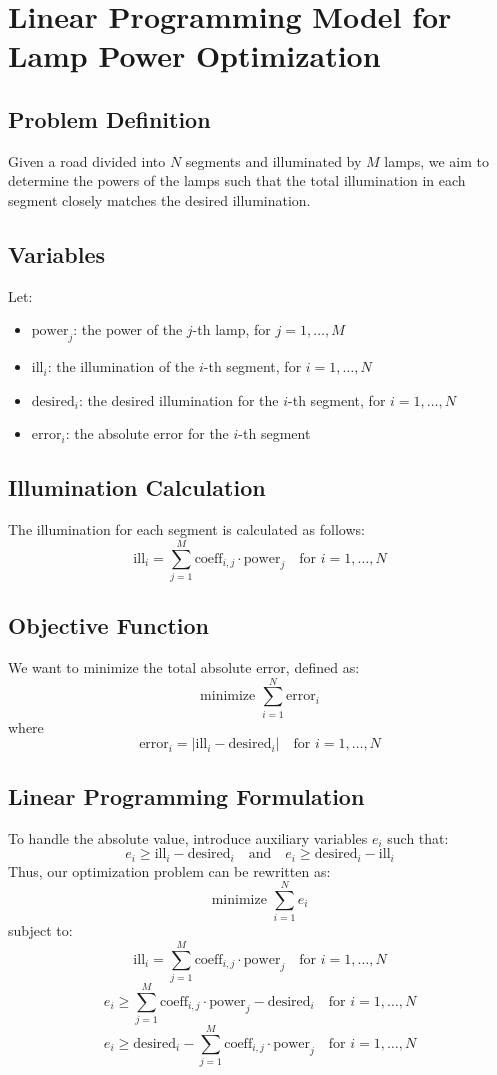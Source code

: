 \documentclass{article}
\begin{document}
\section*{Linear Programming Model for Lamp Power Optimization}

\subsection*{Problem Definition}
Given a road divided into \( N \) segments and illuminated by \( M \) lamps, we aim to determine the powers of the lamps such that the total illumination in each segment closely matches the desired illumination.

\subsection*{Variables}
Let:
\begin{itemize}
    \item \( \text{power}_j \): the power of the \( j \)-th lamp, for \( j = 1, \ldots, M \)
    \item \( \text{ill}_i \): the illumination of the \( i \)-th segment, for \( i = 1, \ldots, N \)
    \item \( \text{desired}_i \): the desired illumination for the \( i \)-th segment, for \( i = 1, \ldots, N \)
    \item \( \text{error}_i \): the absolute error for the \( i \)-th segment
\end{itemize}

\subsection*{Illumination Calculation}
The illumination for each segment is calculated as follows:
\[
\text{ill}_i = \sum_{j=1}^{M} \text{coeff}_{i,j} \cdot \text{power}_j \quad \text{for } i = 1, \ldots, N
\]

\subsection*{Objective Function}
We want to minimize the total absolute error, defined as:
\[
\text{minimize } \sum_{i=1}^{N} \text{error}_i
\]
where
\[
\text{error}_i = |\text{ill}_i - \text{desired}_i| \quad \text{for } i = 1, \ldots, N
\]

\subsection*{Linear Programming Formulation}
To handle the absolute value, introduce auxiliary variables \( e_i \) such that:
\[
e_i \geq \text{ill}_i - \text{desired}_i \quad \text{and} \quad e_i \geq \text{desired}_i - \text{ill}_i
\]
Thus, our optimization problem can be rewritten as:
\[
\text{minimize } \sum_{i=1}^{N} e_i
\]
subject to:
\[
\text{ill}_i = \sum_{j=1}^{M} \text{coeff}_{i,j} \cdot \text{power}_j \quad \text{for } i = 1, \ldots, N
\]
\[
e_i \geq \sum_{j=1}^{M} \text{coeff}_{i,j} \cdot \text{power}_j - \text{desired}_i \quad \text{for } i = 1, \ldots, N
\]
\[
e_i \geq \text{desired}_i - \sum_{j=1}^{M} \text{coeff}_{i,j} \cdot \text{power}_j \quad \text{for } i = 1, \ldots, N
\]
\end{document}
